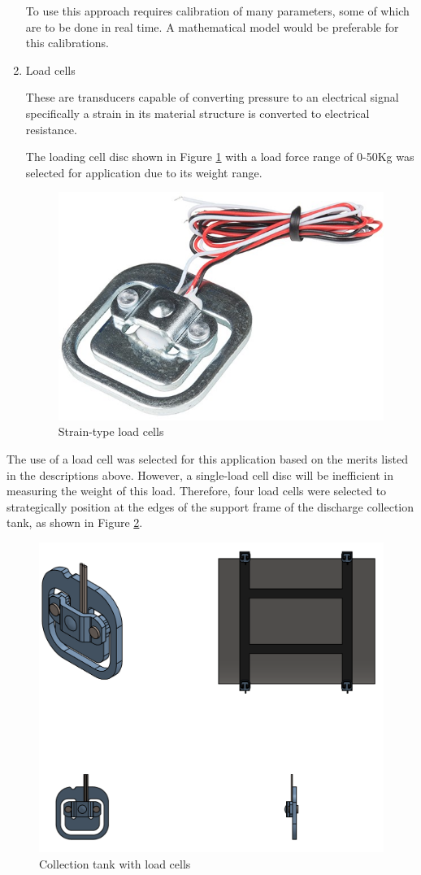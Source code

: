 \begin{enumerate}
    To use this approach requires calibration of many parameters, some of which are to be done in real time. A mathematical model would be preferable for this calibrations.
    \item Load cells
    \par
    These are transducers capable of converting pressure to an electrical signal specifically a strain in its material structure is converted to electrical resistance.
    \par
    The loading cell disc shown in Figure \ref{fig:load_cell_disc} with a load force range of 0-50Kg was selected for application due to its weight range.
    \begin{figure}[H]
        \centering
        \includegraphics[width=.25\textwidth, height=.25\textheight]{Figures/50KgLoadCell.jpg}
        \caption[Strain-type load cells]{Strain-type load cells \cite{loadcell}}
        \label{fig:load_cell_disc}
    \end{figure}
\end{enumerate}
The use of a load cell was selected for this application based on the merits listed in the descriptions above. However, a single-load cell disc will be inefficient in measuring the weight of this load. Therefore, four load cells were selected to strategically position at the edges of the support frame of the discharge collection tank, as shown in Figure \ref{fig:collection_tank_with_load_cells}.
\begin{figure}[H]
    \centering
    \includegraphics[height=.45\textheight]{Figures/CollectionTankWithTheLoadCells.PNG}
    \caption{Collection tank with load cells}
    \label{fig:collection_tank_with_load_cells}
\end{figure}

